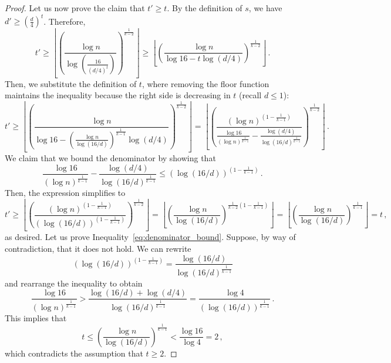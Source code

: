 \begin{theorem}
\begin{proof}
        Let us now prove the claim that $t' \geq t$.
        By the definition of $s$, we have $d' \geq \left( \frac{d}{4} \right)^t$.
        Therefore,
        \[
            t' \geq
            \left\lfloor \left(  \frac{\log n}{\log \left(\frac{16}{(d/4)^t}\right)} \right)^
            {\frac{1}{k-2}} \right\rfloor \geq
            \left\lfloor \left(  \frac{\log n}{\log 16 - t \log (d/4)} \right)^
            {\frac{1}{k-2}} \right\rfloor\,.
        \]
        Then, we substitute the definition of $t$, where removing the floor function
        maintains the inequality because the right side is decreasing in $t$ (recall $d \leq 1$):
        \begin{equation*} \label{eq:t_prime}
            t' \geq
            \left\lfloor \left(  \frac{\log n}
            {\log 16 - \left(  \frac{\log n}{\log (16/d)} \right)^{\frac{1}{k-1}}  \log (d/4)} \right)^
            {\frac{1}{k-2}} \right\rfloor
            =
            \left\lfloor \left(  \frac{(\log n)^{\left(1-\frac{1}{k-1}\right)}}
            {\frac{\log 16}{(\log n)^{\frac{1}{k-1}}} - \frac{\log (d/4)}{\log (16/d)^{\frac{1}{k-1}}} }
            \right)^{\frac{1}{k-2}} \right\rfloor\,.
        \end{equation*}
        We claim that we bound the denominator by showing that
        \begin{equation} \label{eq:denominator_bound}
            \frac{\log 16}{(\log n)^{\frac{1}{k-1}}} - \frac{\log (d/4)}{\log (16/d)^{\frac{1}{k-1}}}
            \leq \left( \log (16/d) \right)^{\left( 1 - \frac{1}{k-1} \right)}\,.
        \end{equation}
        Then, the expression simplifies to
        \[
            t'
            \geq \left\lfloor \left(  \frac{(\log n)^{\left(1-\frac{1}{k-1}\right)}}
            {\left( \log (16/d) \right)^{\left( 1 - \frac{1}{k-1} \right)}}
            \right)^{\frac{1}{k-2}} \right\rfloor
            = \left\lfloor \left(  \frac{\log n}
            {\log (16/d)}
            \right)^{\frac{1}{k-2}\left( 1 - \frac{1}{k-1} \right)} \right\rfloor
            = \left\lfloor \left(  \frac{\log n}{\log (16/d)} \right)^{\frac{1}{k-1}} \right\rfloor
            = t\,,
        \]
        as desired.
        Let us prove Inequality~\eqref{eq:denominator_bound}.
        Suppose, by way of contradiction, that it does not hold.
        We can rewrite
        \[
            (\log (16/d))^{\left( 1 - \frac{1}{k-1} \right)}
            = \frac{\log (16/d)}{\log (16/d)^{\frac{1}{k-1}}}
        \]
        and rearrange the inequality to obtain
        \[
            \frac{\log 16}{(\log n)^{\frac{1}{k-1}}}
            > \frac{\log (16/d) + \log (d/4)}{\log (16/d)^{\frac{1}{k-1}}}
            = \frac{\log 4}{(\log (16/d))^{\frac{1}{k-1}}}\,.
        \]
        This implies that
        \[
            t
            \leq \left( \frac{\log n}{\log (16/d)} \right)^{\frac{1}{k-1}}
            < \frac{\log 16}{\log 4} = 2\,,
        \]
        which contradicts the assumption that $t \geq 2$.
    \end{proof}
\end{theorem}

